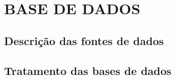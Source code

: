 \chapter[BASE DE DADOS]{BASE DE DADOS} %

\section{Descrição das fontes de dados}

\section{Tratamento das bases de dados}
